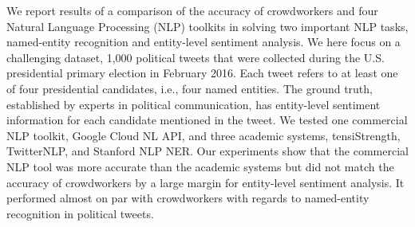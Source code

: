 We report results of a comparison of the accuracy of crowdworkers and four Natural Language Processing (NLP) toolkits in solving two important NLP tasks, named-entity recognition and entity-level sentiment analysis. We here focus on a challenging dataset, 1,000 political tweets that were collected during the U.S. presidential primary election in February 2016. Each tweet refers to at least one of four presidential candidates, i.e., four named entities. The ground truth, established by experts in political communication, has entity-level sentiment information for each candidate mentioned in the tweet. We tested one commercial NLP toolkit, Google Cloud NL API, and three academic systems, tensiStrength, TwitterNLP, and Stanford NLP NER. Our experiments show that the commercial NLP tool was more accurate than the academic systems but did not match the accuracy of crowdworkers by a large margin for entity-level sentiment analysis. It performed almost on par with crowdworkers with regards to named-entity recognition in political tweets.
